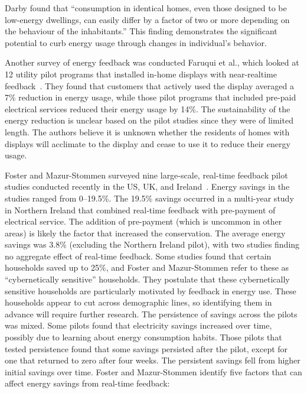 Darby found that ``consumption in identical homes, even those designed to be low-energy dwellings, can easily differ by a factor of two or more depending on the behaviour of the inhabitants.'' This finding demonstrates the significant potential to curb energy usage through changes in individual's behavior.

Another survey of energy feedback was conducted Faruqui et al., which looked at 12 utility pilot programs that installed in-home displays with near-realtime feedback~\cite{Faruqui09}. They found that customers that actively used the display averaged a 7\% reduction in energy usage, while those pilot programs that included pre-paid electrical services reduced their energy usage by 14\%. The sustainability of the energy reduction is unclear based on the pilot studies since they were of limited length. The authors believe it is unknown whether the residents of homes with displays will acclimate to the display and cease to use it to reduce their energy usage.

Foster and Mazur-Stommen surveyed nine large-scale, real-time feedback pilot studies conducted recently in the US, UK, and Ireland~\cite{Foster-2012}. Energy savings in the studies ranged from 0--19.5\%. The 19.5\% savings occurred in a multi-year study in Northern Ireland that combined real-time feedback with pre-payment of electrical service. The addition of pre-payment (which is uncommon in other areas) is likely the factor that increased the conservation. The average energy savings was 3.8\% (excluding the Northern Ireland pilot), with two studies finding no aggregate effect of real-time feedback. Some studies found that certain households saved up to 25\%, and Foster and Mazur-Stommen refer to these as ``cybernetically sensitive'' households. They postulate that these cybernetically sensitive households are particularly motivated by feedback in energy use. These households appear to cut across demographic lines, so identifying them in advance will require further research. The persistence of savings across the pilots was mixed. Some pilots found that electricity savings increased over time, possibly due to learning about energy consumption habits. Those pilots that tested persistence found that some savings persisted after the pilot, except for one that returned to zero after four weeks. The persistent savings fell from higher initial savings over time. Foster and Mazur-Stommen identify five factors that can affect energy savings from real-time feedback:

